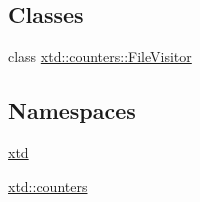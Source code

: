 \subsection*{Classes}
\begin{DoxyCompactItemize}
\item 
class \hyperlink{classxtd_1_1counters_1_1FileVisitor}{xtd\-::counters\-::\-File\-Visitor}
\end{DoxyCompactItemize}
\subsection*{Namespaces}
\begin{DoxyCompactItemize}
\item 
\hyperlink{namespacextd}{xtd}
\item 
\hyperlink{namespacextd_1_1counters}{xtd\-::counters}
\end{DoxyCompactItemize}
